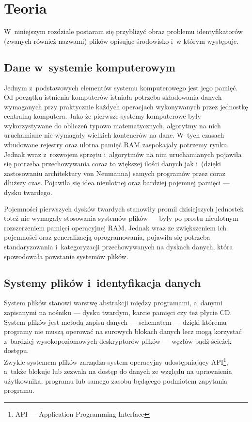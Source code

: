 \chapter{Teoria}
\label{teoria}
\par
 W~niniejszym rozdziale postaram się przybliżyć obraz problemu identyfikatorów (zwanych również nazwami) plików opisując środowisko i~w którym występuje.

\section{Dane w~systemie komputerowym}
\par
Jednym z~podstawowych elementów systemu komputerowego jest jego pamięć. Od początku istnienia komputerów istniała potrzeba składowania danych wymaganych przy praktycznie każdych operacjach wykonywanych przez jednostkę centralną komputera. Jako że pierwsze systemy komputerowe były wykorzystywane do obliczeń typowo matematycznych, algorytmy na nich uruchamiane nie wymagały wielkich kontenerów na dane. W~tych czasach wbudowane rejestry oraz ulotna pamięć RAM zaspokajały potrzemy rynku. Jednak wraz z~rozwojem sprzętu i~algorytmów na nim uruchamianych pojawiła się potrzeba przechowywania coraz to większej ilości danych jak i~(dzięki zastosowaniu architektury von Neumanna) samych programów przez coraz dłuższy czas. Pojawiła się idea nieulotnej oraz bardziej pojemnej pamięci --- dysku twardego.\\

\par
Pojemności pierwszych dysków twardych stanowiły promil dzisiejszych jednostek toteż nie wymagały stosowania systemów plików --- były po prostu nieulotnym rozszerzeniem pamięci operacyjnej RAM. Jednak wraz ze zwiększeniem ich pojemności oraz generalizacją oprogramowania, pojawiła się potrzeba standaryzowania i~kategoryzacji przechowywanych na dyskach danych, która spowodowała powstanie systemów plików.

\section{Systemy plików i~identyfikacja danych}
\par
System plików stanowi warstwę abstrakcji między programami, a~danymi zapisanymi na nośniku --- dysku twardym, karcie pamięci czy też płycie CD. System plików jest metodą zapisu danych --- schematem --- dzięki któremu programy nie muszą operować na surowych blokach danych lecz mogą korzystać z~bardziej wysokopoziomowych deskryptorów plików --- węzłów bądź ścieżek dostępu.\\
Zwykle systemem plików zarządza system operacyjny udostępniający API\footnote{API --- Application Programming Interface}, a~także blokuje lub zezwala na dostęp do danych ze względu na uprawnienia użytkownika, programu lub samego zasobu będącego podmiotem zapytania programu.\\

